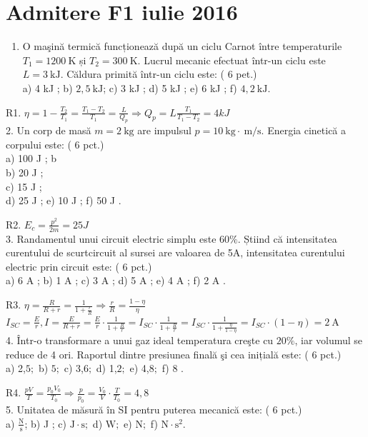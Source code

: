 \section{Admitere F1 iulie 2016}

\begin{enumerate}
  \item O maşină termică funcționează după un ciclu Carnot între temperaturile $T_{1}=1200 \mathrm{~K}$ și $T_{2}=300 \mathrm{~K}$. Lucrul mecanic efectuat într-un ciclu este $L=3 \mathrm{~kJ}$. Căldura primită într-un ciclu este: ( 6 pet.)\\
a) 4 kJ ; b) $2,5 \mathrm{~kJ}$; c) 3 kJ ; d) 5 kJ ; e) 6 kJ ; f) $4,2 \mathrm{~kJ}$.
\end{enumerate}

R1. $\eta=1-\frac{T_{2}}{T_{1}}=\frac{T_{1}-T_{2}}{T_{1}}=\frac{L}{Q_{p}} \Rightarrow Q_{p}=L \frac{T_{1}}{T_{1}-T_{2}}=4 k J$\\
2. Un corp de masă $m=2 \mathrm{~kg}$ are impulsul $p=10 \mathrm{~kg} \cdot \mathrm{~m} / \mathrm{s}$. Energia cinetică a corpului este: ( 6 pct.)\\
a) 100 J ; b\\
b) 20 J ;\\
c) 15 J ;\\
d) 25 J ; e) 10 J ; f) 50 J .

R2. $E_{c}=\frac{p^{2}}{2 m}=25 J$\\
3. Randamentul unui circuit electric simplu este $60 \%$. Știind că intensitatea curentului de scurtcircuit al sursei are valoarea de 5A, intensitatea curentului electric prin circuit este: ( 6 pct.)\\
a) 6 A ; b) 1 A ; c) 3 A ; d) 5 A ; e) 4 A ; f) 2 A .

R3. $\eta=\frac{R}{R+r}=\frac{1}{1+\frac{r}{R}} \Rightarrow \frac{r}{R}=\frac{1-\eta}{\eta}$\\
$I_{S C}=\frac{E}{r}, I=\frac{E}{R+r}=\frac{E}{r} \cdot \frac{1}{1+\frac{R}{r}}=I_{S C} \cdot \frac{1}{1+\frac{R}{r}}=I_{S C} \cdot \frac{1}{1+\frac{\eta}{1-\eta}}=I_{S C} \cdot(1-\eta)=2 \mathrm{~A}$\\
4. Într-o transformare a unui gaz ideal temperatura creşte cu $20 \%$, iar volumul se reduce de 4 ori. Raportul dintre presiunea finală şi cea inițială este: ( 6 pct.)\\
a) 2,$5 ;$ b) $5 ;$ c) 3,$6 ;$ d) 1,$2 ;$ e) 4,$8 ;$ f) 8 .

R4. $\frac{p V}{T}=\frac{p_{0} V_{0}}{T_{0}} \Rightarrow \frac{p}{p_{0}}=\frac{V_{0}}{V} \cdot \frac{T}{T_{0}}=4,8$\\
5. Unitatea de măsură în SI pentru puterea mecanică este: ( 6 pct.)\\
a) $\frac{\mathrm{N}}{\mathrm{s}}$; b) J ; c) $\mathrm{J} \cdot \mathrm{s} ;$ d) $\mathrm{W} ;$ e) $\mathrm{N} ;$ f) $\mathrm{N} \cdot \mathrm{s}^{2}$.

